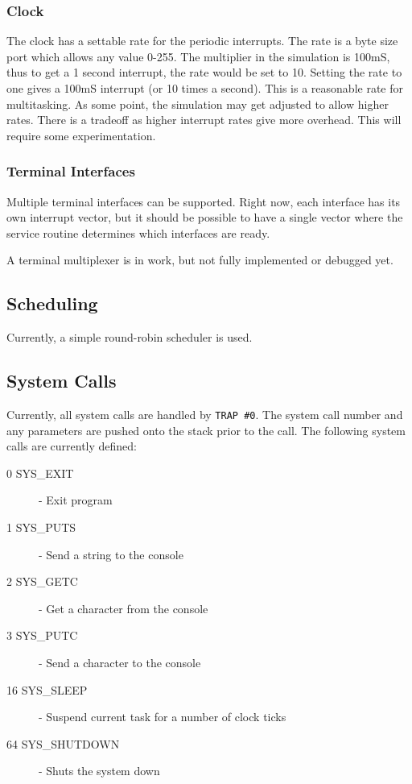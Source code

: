 \documentclass[10pt, openany]{book}
\begin{document}
\subsubsection{Clock}
The clock has a settable rate for the periodic interrupts.  The rate is a byte size port which allows any value 0-255.  The multiplier in the simulation is 100mS, thus to get a 1 second interrupt, the rate would be set to 10.  Setting the rate to one gives a 100mS interrupt (or 10 times a second).  This is a reasonable rate for multitasking.  As some point, the simulation may get adjusted to allow higher rates.  There is a tradeoff as higher interrupt rates give more overhead.  This will require some experimentation.

\subsubsection{Terminal Interfaces}
Multiple terminal interfaces can be supported.  Right now, each interface has its own interrupt vector, but it should be possible to have a single vector where the service routine determines which interfaces are ready.

A terminal multiplexer is in work, but not fully implemented or debugged yet.

\subsection{Scheduling}
Currently, a simple round-robin scheduler is used.

\subsection{System Calls}
Currently, all system calls are handled by \verb|TRAP #0|.  The system call number and any parameters are pushed onto the stack prior to the call.  The following system calls are currently defined:
\begin{description}
  \item[0 SYS\_EXIT] - Exit program
  \item[1 SYS\_PUTS] - Send a string to the console
  \item[2 SYS\_GETC] - Get a character from the console
  \item[3 SYS\_PUTC] - Send a character to the console
  \item[16 SYS\_SLEEP] - Suspend current task for a number of clock ticks
  \item[64 SYS\_SHUTDOWN] - Shuts the system down
\end{description}
\end{document}
